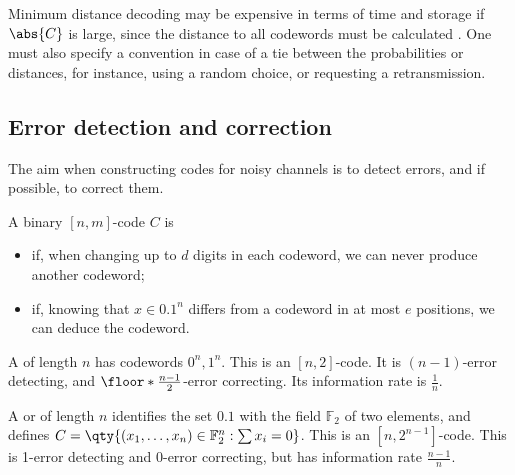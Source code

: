 \begin{remark}
    Minimum distance decoding may be expensive in terms of time and storage if $\abs{C}$ is large, since the distance to all codewords must be calculated .
    One must also specify a convention in case of a tie between the probabilities or distances, for instance, using a random choice, or requesting a retransmission.
\end{remark}

\subsection{Error detection and correction}
The aim when constructing codes for noisy channels is to detect errors, and if possible, to correct them.

\begin{definition}
    A binary $[n,m]$-code $C$ is
    \begin{itemize}
        \item {} if, when changing up to $d$ digits in each codeword, we can never produce another codeword;
        \item {} if, knowing that $x \in \qty{0,1}^n$ differs from a codeword in at most $e$ positions, we can deduce the codeword.
    \end{itemize}
\end{definition}

\begin{example}
    A  of length $n$ has codewords $0^n, 1^n$.
    This is an $[n,2]$-code.
    It is $(n-1)$-error detecting, and $\floor*{\frac{n-1}{2}}$-error correcting.
    Its information rate is $\frac{1}{n}$.
\end{example}

\begin{example}
    A  or  of length $n$ identifies the set $\qty{0,1}$ with the field $\mathbb F_2$ of two elements, and defines $C = \qty{(x_1, \dots, x_n) \in \mathbb F_2^n : \sum x_i = 0}$.
    This is an $[n,2^{n-1}]$-code.
    This is 1-error detecting and 0-error correcting, but has information rate $\frac{n-1}{n}$.
\end{example}


